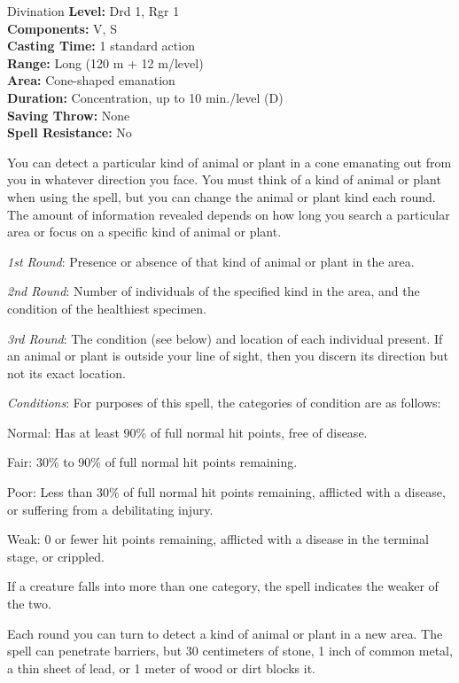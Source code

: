{Divination}
{
	\textbf{Level:}
	Drd 1, Rgr 1\\
	\textbf{Components:}
	V, S\\
	\textbf{Casting Time:}
	1 standard action\\
	\textbf{Range:}
	Long (120 m + 12 m/level)\\
	\textbf{Area:}
	Cone-shaped emanation\\
	\textbf{Duration:}
	Concentration, up to 10 min./level (D)\\
	\textbf{Saving Throw:}
	None\\
	\textbf{Spell Resistance:}
	No\\
}
{
	You can detect a particular kind of animal or plant in a cone emanating out from you in whatever direction you face. You must think of a kind of animal or plant when using the spell, but you can change the animal or plant kind each round. The amount of information revealed depends on how long you search a particular area or focus on a specific kind of animal or plant.

	\textit{1st Round}:
	Presence or absence of that kind of animal or plant in the area.

	\textit{2nd Round}:
	Number of individuals of the specified kind in the area, and the condition of the healthiest specimen.

	\textit{3rd Round}:
	The condition (see below) and location of each individual present. If an animal or plant is outside your line of sight, then you discern its direction but not its exact location.

	\textit{Conditions}:
	For purposes of this spell, the categories of condition are as follows:

	Normal:
	Has at least 90\% of full normal hit points, free of disease.

	Fair:
	30\% to 90\% of full normal hit points remaining.

	Poor:
	Less than 30\% of full normal hit points remaining, afflicted with a disease, or suffering from a debilitating injury.

	Weak:
	0 or fewer hit points remaining, afflicted with a disease in the terminal stage, or crippled.

	If a creature falls into more than one category, the spell indicates the weaker of the two.

	Each round you can turn to detect a kind of animal or plant in a new area. The spell can penetrate barriers, but 30 centimeters of stone, 1 inch of common metal, a thin sheet of lead, or 1 meter of wood or dirt blocks it.

}
